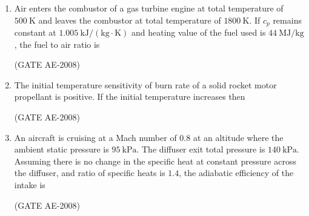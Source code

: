 \documentclass[journal,12pt,onecolumn]{IEEEtran}
\theoremstyle{remark}
\begin{document}
\begin{enumerate}
    \quad

\item  Air enters the combustor of a gas turbine engine at total temperature of $500 \ \mathrm{K}$ and leaves the combustor at total temperature of $1800 \ \mathrm{K}$. If $c_p$ remains constant at $1.005 \ \mathrm{kJ/(kg \cdot K)}$ and heating value of the fuel used is $44 \ \mathrm{MJ/kg}$, the fuel to air ratio is  
\begin{enumerate}
\end{enumerate}
\hfill(GATE AE-2008)

    \quad

\item The initial temperature sensitivity of burn rate of a solid rocket motor propellant is positive. If the initial temperature increases then  
\begin{enumerate}
\end{enumerate}
\hfill(GATE AE-2008)

    \quad

\item An aircraft is cruising at a Mach number of $0.8$ at an altitude where the ambient static pressure is $95 \ \mathrm{kPa}$. The diffuser exit total pressure is $140 \ \mathrm{kPa}$. Assuming there is no change in the specific heat at constant pressure across the diffuser, and ratio of specific heats is $1.4$, the adiabatic efficiency of the intake is  
\begin{enumerate}
\end{enumerate}
\hfill(GATE AE-2008)


\end{enumerate}
\end{document}
